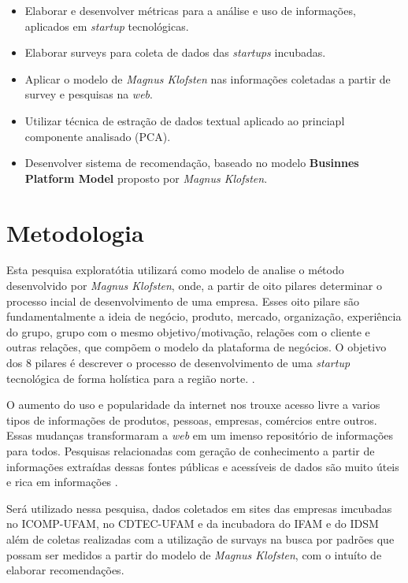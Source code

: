 \documentclass[12pt]{article}
\begin{document}
\begin{itemize}
	\item{Elaborar e desenvolver métricas para a análise e uso de informações, aplicados em \textit{startup} tecnológicas.}
	\item{Elaborar surveys para coleta de dados das \textit{startups} incubadas.}
	\item{Aplicar o modelo de \textit{Magnus Klofsten} nas informações coletadas a partir de survey e pesquisas na \textit{web}.}
	\item{Utilizar técnica de estração de dados textual aplicado ao princiapl componente analisado (PCA).}
	\item{Desenvolver sistema de recomendação, baseado no modelo \textbf{Businnes Platform Model} proposto por \textit{Magnus Klofsten}.}
\end{itemize}

\section{Metodologia} \label{sec:Metod}

Esta pesquisa exploratótia utilizará como modelo de analise o método desenvolvido por \textit{Magnus Klofsten}, onde, a partir de oito pilares determinar o processo incial de desenvolvimento de uma empresa. Esses oito pilare são fundamentalmente a ideia de negócio, produto, mercado, organização, experiência do grupo, grupo com o mesmo objetivo/motivação, relações com o cliente e outras relações, que compõem o modelo da plataforma de negócios. O objetivo dos 8 pilares é descrever o processo de desenvolvimento de uma \textit{startup} tecnológica de forma holística para a região norte. \cite{davidsson2003business:2003}.

O aumento do uso e popularidade da internet nos trouxe acesso livre a varios tipos de informações de produtos, pessoas, empresas, comércios entre outros. Essas mudanças transformaram a \textit{web} em um imenso repositório de informações para todos. Pesquisas relacionadas com geração de conhecimento a partir de informações extraídas dessas fontes públicas e acessíveis de dados são muito úteis e rica em informações \cite{liu:11}.

Será utilizado nessa pesquisa, dados coletados em sites das empresas imcubadas no ICOMP-UFAM, no CDTEC-UFAM e da incubadora do IFAM e do IDSM além de coletas realizadas com a utilização de survays na busca por padrões que possam ser medidos a partir do modelo de \textit{Magnus Klofsten}, com o intuíto de elaborar recomendações.
\end{document}
